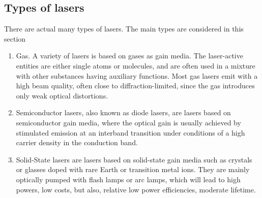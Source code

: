 \subsection{Types of lasers}\cite{lasertech}
	\label{blDOLSRtypes}
There are actual many types of \acs{laser}s. The main types are considered in this section
\begin{enumerate}
	\item Gas. A variety of \acs{laser}s is based on gases as gain media. The \acs{laser}-active entities are either single atoms or molecules, and are often used in a mixture with other substances having auxiliary functions. Most gas lasers emit with a high beam quality, often close to diffraction-limited, since the gas introduces only weak optical distortions.
	\item Semiconductor \acs{laser}s, also known as diode \acs{laser}s, are \acs{laser}s based on semiconductor gain media, where the optical gain is usually achieved by stimulated emission at an interband transition under conditions of a high carrier density in the conduction band.  
	\item Solid-State \acs{laser}s are \acs{laser}s based on solid-state gain media such as crystals or glasses doped with rare Earth or transition metal ions. They are mainly optically pumped with flash lamps or arc lamps, which will lead to high powers, low costs, but also, relative low power efficiencies, moderate lifetime.
\end{enumerate} 

